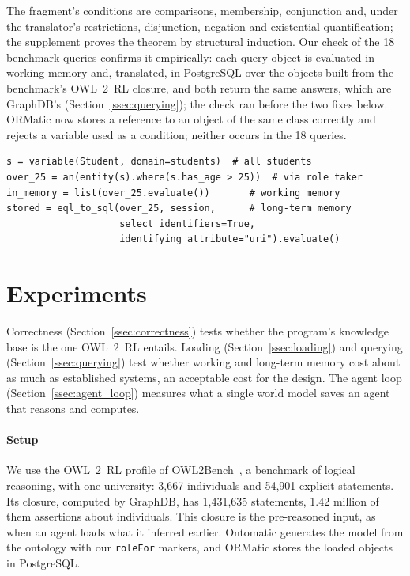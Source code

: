 \documentclass[sigconf,anonymous]{aamas}
\begin{document}
The fragment's conditions are comparisons, membership, conjunction and, under the translator's restrictions, disjunction, negation and existential quantification; the supplement proves the theorem by structural induction. Our check of the 18 benchmark queries confirms it empirically: each query object is evaluated in working memory and, translated, in PostgreSQL over the objects built from the benchmark's OWL~2~RL closure, and both return the same answers, which are GraphDB's (Section~\ref{ssec:querying}); the check ran before the two fixes below. ORMatic now stores a reference to an object of the same class correctly and rejects a variable used as a condition; neither occurs in the 18 queries.

\begin{lstlisting}[style=eql, float=h, caption={One \acs{eql} query evaluated in working memory and, translated by ORMatic, in long-term memory.}, label={lst:ormatic}]
s = variable(Student, domain=students)  # all students
over_25 = an(entity(s).where(s.has_age > 25))  # via role taker
in_memory = list(over_25.evaluate())       # working memory
stored = eql_to_sql(over_25, session,      # long-term memory
                    select_identifiers=True,
                    identifying_attribute="uri").evaluate()
\end{lstlisting}

\section{Experiments}
\label{sec:experiments}

Correctness (Section~\ref{ssec:correctness}) tests whether the program's knowledge base is the one OWL~2~RL entails. Loading (Section~\ref{ssec:loading}) and querying (Section~\ref{ssec:querying}) test whether working and long-term memory cost about as much as established systems, an acceptable cost for the design. The agent loop (Section~\ref{ssec:agent_loop}) measures what a single world model saves an agent that reasons and computes.

\paragraph{Setup}
We use the OWL~2~RL profile of OWL2Bench~\cite{singh2020owl2bench}, a benchmark of logical reasoning, with one university: 3,667 individuals and 54,901 explicit statements. Its closure, computed by GraphDB, has 1,431,635 statements, 1.42 million of them assertions about individuals. This closure is the pre-reasoned input, as when an agent loads what it inferred earlier. Ontomatic generates the model from the ontology with our \texttt{roleFor} markers, and ORMatic stores the loaded objects in PostgreSQL.
\end{document}
